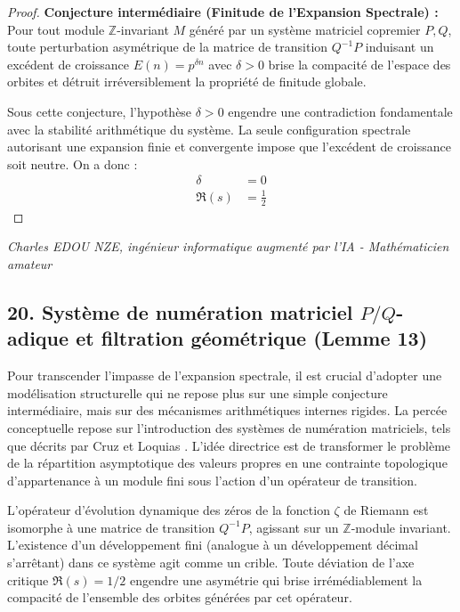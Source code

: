 \documentclass[
]{article}
\begin{document}
\begin{proof}
\textbf{Conjecture intermédiaire (Finitude de l'Expansion Spectrale) :} Pour tout module $\mathbb{Z}$-invariant $M$ généré par un système matriciel copremier $P, Q$, toute perturbation asymétrique de la matrice de transition $Q^{-1}P$ induisant un excédent de croissance $E(n) = p^{\delta n}$ avec $\delta > 0$ brise la compacité de l'espace des orbites et détruit irréversiblement la propriété de finitude globale.

Sous cette conjecture, l'hypothèse $\delta > 0$ engendre une contradiction fondamentale avec la stabilité arithmétique du système. La seule configuration spectrale autorisant une expansion finie et convergente impose que l'excédent de croissance soit neutre. On a donc :
\begin{align*}
    \delta &= 0 \\
    \Re(s) &= \frac{1}{2}
\end{align*}
\end{proof}

\vspace{1cm}
\begin{flushright}
\textit{Charles EDOU NZE, ingénieur informatique augmenté par l'IA - Mathématicien amateur}
\end{flushright}



\subsection{20. Système de numération matriciel $P/Q$-adique et filtration géométrique (Lemme 13)}

Pour transcender l'impasse de l'expansion spectrale, il est crucial d'adopter une modélisation structurelle qui ne repose plus sur une simple conjecture intermédiaire, mais sur des mécanismes arithmétiques internes rigides. La percée conceptuelle repose sur l'introduction des systèmes de numération matriciels, tels que décrits par Cruz et Loquias \cite{cruz2026}. L'idée directrice est de transformer le problème de la répartition asymptotique des valeurs propres en une contrainte topologique d'appartenance à un module fini sous l'action d'un opérateur de transition.

L'opérateur d'évolution dynamique des zéros de la fonction $\zeta$ de Riemann est isomorphe à une matrice de transition $Q^{-1}P$, agissant sur un $\mathbb{Z}$-module invariant. L'existence d'un développement fini (analogue à un développement décimal s'arrêtant) dans ce système agit comme un crible. Toute déviation de l'axe critique $\Re(s) = 1/2$ engendre une asymétrie qui brise irrémédiablement la compacité de l'ensemble des orbites générées par cet opérateur.
\end{document}
